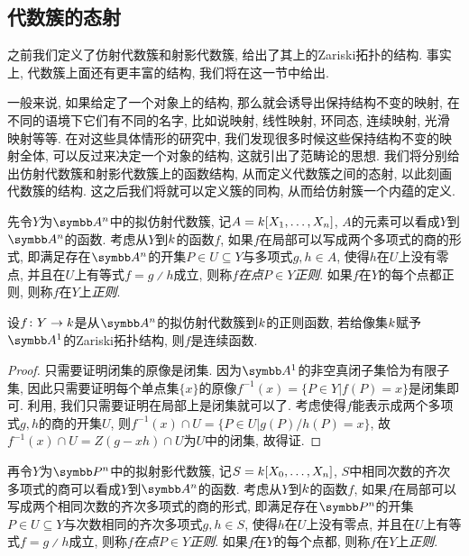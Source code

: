 \subsection{代数簇的态射}

之前我们定义了仿射代数簇和射影代数簇, 给出了其上的Zariski拓扑的结构. 事实上, 代数簇上面还有更丰富的结构, 我们将在这一节中给出.

一般来说, 如果给定了一个对象上的结构, 那么就会诱导出保持结构不变的映射, 在不同的语境下它们有不同的名字, 比如说映射, 线性映射, 环同态, 连续映射, 光滑映射等等. 在对这些具体情形的研究中, 我们发现很多时候这些保持结构不变的映射全体, 可以反过来决定一个对象的结构, 这就引出了范畴论的思想. 我们将分别给出仿射代数簇和射影代数簇上的函数结构, 从而定义代数簇之间的态射, 以此刻画代数簇的结构. 这之后我们将就可以定义簇的同构, 从而给仿射簇一个内蕴的定义.

\begin{definition}
  先令$Y$为$\AF^n$中的拟仿射代数簇, 记$A=k [X_1, \dotsc, X_n]$, $A$的元素可以看成$Y$到$\AF^n$的函数. 考虑从$Y$到$k$的函数$f$, 如果$f$在局部可以写成两个多项式的商的形式, 即满足存在$\AF^n$的开集$P\in U\subseteq Y$与多项式$g, h\in A$, 使得$h$在$U$上没有零点, 并且在$U$上有等式$f=g{\divslash}h$成立, 则称$f$\emph{在点$P\in Y$正则}. 如果$f$在$Y$的每个点都正则, 则称$f$在$Y$上\emph{正则}.
\end{definition}

\begin{proposition}\label{prop:affineregularcontinuous}
  设$f\colon Y\to k$是从$\AF^n$的拟仿射代数簇到$k$的正则函数, 若给像集$k$赋予$\AF^1$的Zariski拓扑结构, 则$f$是连续函数.
\end{proposition}

\begin{proof}
  只需要证明闭集的原像是闭集. 因为$\AF^1$的非空真闭子集恰为有限子集, 因此只需要证明每个单点集$\{x\}$的原像$f^{-1}(x)=\{P\in Y\vert f(P)=x\}$是闭集即可. 利用, 我们只需要证明在局部上是闭集就可以了. 考虑使得$f$能表示成两个多项式$g, h$的商的开集$U$, 则$f^{-1}(x)\cap U=\{P\in U\vert g(P)/h(P)=x\}$, 故$f^{-1}(x)\cap U=Z(g-xh)\cap U$为$U$中的闭集, 故得证.
\end{proof}

\begin{definition}
  再令$Y$为$\PP^n$中的拟射影代数簇, 记$S=k [X_0, \dotsc, X_n]$, $S$中相同次数的齐次多项式的商可以看成$Y$到$\AF^n$的函数. 考虑从$Y$到$k$的函数$f$, 如果$f$在局部可以写成两个相同次数的齐次多项式的商的形式, 即满足存在$\PP^n$的开集$P\in U\subseteq Y$与次数相同的齐次多项式$g, h\in S$, 使得$h$在$U$上没有零点, 并且在$U$上有等式$f=g{\divslash}h$成立, 则称$f$\emph{在点$P\in Y$正则}. 如果$f$在$Y$的每个点都, 则称$f$在$Y$上\emph{正则}.
\end{definition}

